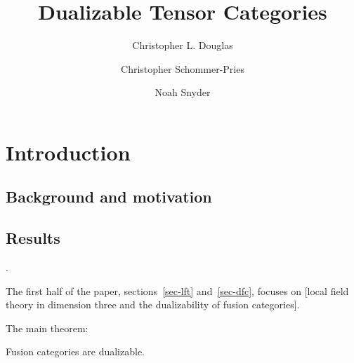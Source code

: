 \documentclass{amsart}
\begin{document}
\title{Dualizable Tensor Categories}

\begin{abstract}

\end{abstract}
	
\author{Christopher L. Douglas}
\address{Department of Mathematics, University of California, Berkeley, CA 94720, USA}
	
\author{Christopher Schommer-Pries}
\address{Department of Mathematics \\
} %

\author{Noah Snyder}
\address{}

\maketitle	
\tableofcontents

\section{Introduction}




\subsection{Background and motivation}

\subsection{Results}.


The first half of the paper, sections~\ref{sec-lft} and~\ref{sec-dfc}, focuses on [local field theory in dimension three and the dualizability of fusion categories].

The main theorem:
\begin{theorem}
Fusion categories are dualizable.
\end{theorem}
\end{document}
